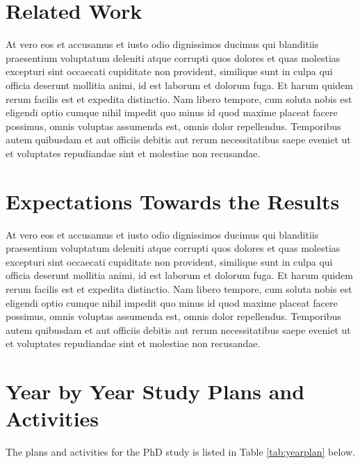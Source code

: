 \documentclass[12pt]{extarticle}
\begin{document}
\section{Related Work}
At vero eos et accusamus et iusto odio dignissimos ducimus qui blanditiis praesentium voluptatum deleniti atque corrupti quos dolores et quas molestias excepturi sint occaecati cupiditate non provident, similique sunt in culpa qui officia deserunt mollitia animi, id est laborum et dolorum fuga. Et harum quidem rerum facilis est et expedita distinctio. Nam libero tempore, cum soluta nobis est eligendi optio cumque nihil impedit quo minus id quod maxime placeat facere possimus, omnis voluptas assumenda est, omnis dolor repellendus. Temporibus autem quibusdam et aut officiis debitis aut rerum necessitatibus saepe eveniet ut et voluptates repudiandae sint et molestiae non recusandae.

\section{Expectations Towards the Results}
At vero eos et accusamus et iusto odio dignissimos ducimus qui blanditiis praesentium voluptatum deleniti atque corrupti quos dolores et quas molestias excepturi sint occaecati cupiditate non provident, similique sunt in culpa qui officia deserunt mollitia animi, id est laborum et dolorum fuga. Et harum quidem rerum facilis est et expedita distinctio. Nam libero tempore, cum soluta nobis est eligendi optio cumque nihil impedit quo minus id quod maxime placeat facere possimus, omnis voluptas assumenda est, omnis dolor repellendus. Temporibus autem quibusdam et aut officiis debitis aut rerum necessitatibus saepe eveniet ut et voluptates repudiandae sint et molestiae non recusandae.


\section{Year by Year Study Plans and Activities}
The plans and activities for the PhD study is listed in Table \ref{tab:yearplan} below.
\end{document}

